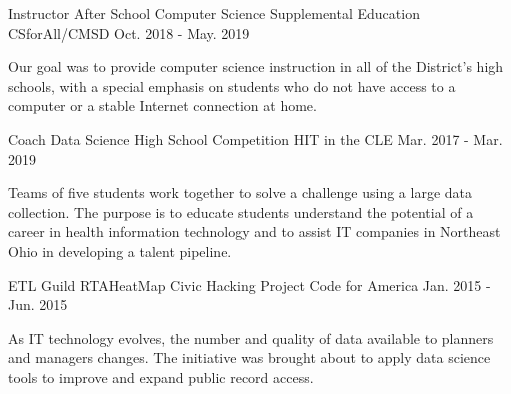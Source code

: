 
\begin{cventries}

  \cventry
    {Instructor} %
    {After School Computer Science Supplemental Education} %
    {CSforAll/CMSD} %
    {Oct. 2018 - May. 2019} %
    {
      \begin{cvcompactparagraph}
        Our goal was to provide computer science instruction in all of the District's high schools, with a special emphasis on students who do not have access to a computer or a stable Internet connection at home.
      \end{cvcompactparagraph}
    }
  \cventry
    {Coach} %
    {Data Science High School Competition} %
    {HIT in the CLE} %
    {Mar. 2017 - Mar. 2019} %
    {
      \begin{cvcompactparagraph}
        Teams of five students work together to solve a challenge using a large data collection. The purpose is to educate students understand the potential of a career in health information technology and to assist IT companies in Northeast Ohio in developing a talent pipeline.
      \end{cvcompactparagraph}
    }
  \cventry
    {ETL Guild} %
    {RTAHeatMap Civic Hacking Project} %
    {Code for America} %
    {Jan. 2015 - Jun. 2015} %
    {
      \begin{cvcompactparagraph}
        As IT technology evolves, the number and quality of data available to planners and managers changes. The initiative was brought about to apply data science tools to improve and expand public record access.
      \end{cvcompactparagraph}
}
\end{cventries}
